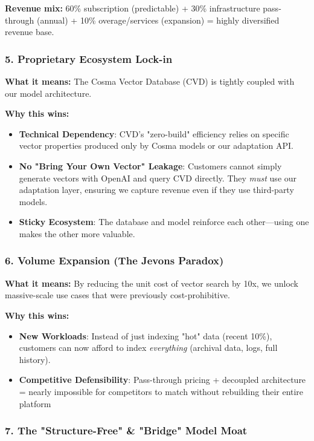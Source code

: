 \textbf{Revenue mix:} 60\% subscription (predictable) + 30\% infrastructure pass-through (annual) + 10\% overage/services (expansion) = highly diversified revenue base.

\subsubsection{5. Proprietary Ecosystem Lock-in}

\textbf{What it means:} The Cosma Vector Database (CVD) is tightly coupled with our model architecture.

\textbf{Why this wins:}
\begin{itemize}[noitemsep]
    \item \textbf{Technical Dependency}: CVD's "zero-build" efficiency relies on specific vector properties produced only by Cosma models or our adaptation API.
    \item \textbf{No "Bring Your Own Vector" Leakage}: Customers cannot simply generate vectors with OpenAI and query CVD directly. They \textit{must} use our adaptation layer, ensuring we capture revenue even if they use third-party models.
    \item \textbf{Sticky Ecosystem}: The database and model reinforce each other—using one makes the other more valuable.
\end{itemize}

\subsubsection{6. Volume Expansion (The Jevons Paradox)}

\textbf{What it means:} By reducing the unit cost of vector search by 10x, we unlock massive-scale use cases that were previously cost-prohibitive.

\textbf{Why this wins:}
\begin{itemize}[noitemsep]
    \item \textbf{New Workloads}: Instead of just indexing "hot" data (recent 10\%), customers can now afford to index \textit{everything} (archival data, logs, full history).
    \item \textbf{Competitive Defensibility}: Pass-through pricing + decoupled architecture = nearly impossible for competitors to match without rebuilding their entire platform
\end{itemize}

\subsubsection{7. The "Structure-Free" \& "Bridge" Model Moat}

